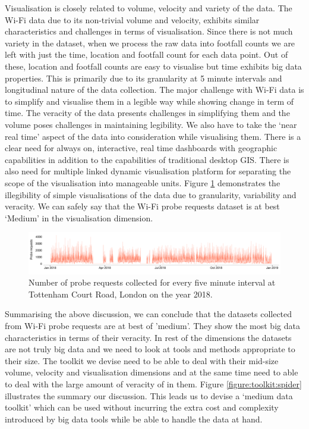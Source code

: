 Visualisation is closely related to volume, velocity and variety of the data.
The Wi-Fi data due to its non-trivial volume and velocity, exhibits similar characteristics and challenges in terms of visualisation.
Since there is not much variety in the dataset, when we process the raw data into footfall counts we are left with just the time, location and footfall count for each data point.
Out of these, location and footfall counts are easy to visualise but time exhibits big data properties.
This is primarily due to its granularity at 5 minute intervals and longitudinal nature of the data collection.
The major challenge with Wi-Fi data is to simplify and visualise them in a legible way while showing change in term of time.
The veracity of the data presents challenges in simplifying them and the volume poses challenges in maintaining legibility.
We also have to take the `near real time' aspect of the data into consideration while visualising them.
There is a clear need for always on, interactive, real time dashboards with geographic capabilities in addition to the capabilities of traditional desktop GIS.
There is also need for multiple linked dynamic visualisation platform for separating the scope of the visualisation into manageable units.
Figure \ref{figure:toolkit:visualisation} demonstrates the illegibility of simple visualisations of the data due to granularity, variability and veracity.
We can safely say that the Wi-Fi probe requests dataset is at best `Medium' in the visualisation dimension.

\begin{figure}
  \includegraphics{images/data-visualisation-challenge.png}
  \caption{Number of probe requests collected for every five minute interval at Tottenham Court Road, London on the year 2018.}
  \label{figure:toolkit:visualisation}
\end{figure}

Summarising the above discussion, we can conclude that the datasets collected from Wi-Fi probe requests are at best of 'medium'.
They show the most big data characteristics in terms of their veracity.
In rest of the dimensions the datasets are not truly big data and we need to look at tools and methods appropriate to their size.
The toolkit we devise need to be able to deal with their mid-size volume, velocity and visualisation dimensions and at the same time need to able to deal with the large amount of veracity of in them.
Figure \ref{figure:toolkit:spider} illustrates the summary our discussion.
This leads us to devise a `medium data toolkit' which can be used without incurring the extra cost and complexity introduced by big data tools while be able to handle the data at hand.

